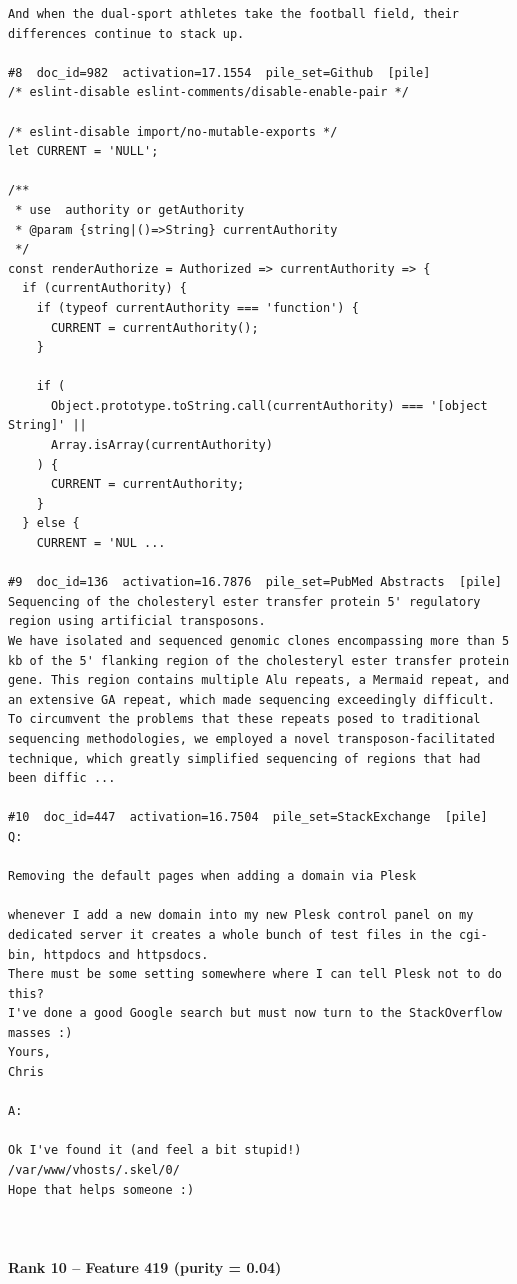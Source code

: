 \begin{verbatim}
And when the dual-sport athletes take the football field, their differences continue to stack up.

#8  doc_id=982  activation=17.1554  pile_set=Github  [pile]
/* eslint-disable eslint-comments/disable-enable-pair */

/* eslint-disable import/no-mutable-exports */
let CURRENT = 'NULL';

/**
 * use  authority or getAuthority
 * @param {string|()=>String} currentAuthority
 */
const renderAuthorize = Authorized => currentAuthority => {
  if (currentAuthority) {
    if (typeof currentAuthority === 'function') {
      CURRENT = currentAuthority();
    }

    if (
      Object.prototype.toString.call(currentAuthority) === '[object String]' ||
      Array.isArray(currentAuthority)
    ) {
      CURRENT = currentAuthority;
    }
  } else {
    CURRENT = 'NUL ...

#9  doc_id=136  activation=16.7876  pile_set=PubMed Abstracts  [pile]
Sequencing of the cholesteryl ester transfer protein 5' regulatory region using artificial transposons.
We have isolated and sequenced genomic clones encompassing more than 5 kb of the 5' flanking region of the cholesteryl ester transfer protein gene. This region contains multiple Alu repeats, a Mermaid repeat, and an extensive GA repeat, which made sequencing exceedingly difficult. To circumvent the problems that these repeats posed to traditional sequencing methodologies, we employed a novel transposon-facilitated technique, which greatly simplified sequencing of regions that had been diffic ...

#10  doc_id=447  activation=16.7504  pile_set=StackExchange  [pile]
Q:

Removing the default pages when adding a domain via Plesk

whenever I add a new domain into my new Plesk control panel on my dedicated server it creates a whole bunch of test files in the cgi-bin, httpdocs and httpsdocs.
There must be some setting somewhere where I can tell Plesk not to do this?
I've done a good Google search but must now turn to the StackOverflow masses :)
Yours,
Chris

A:

Ok I've found it (and feel a bit stupid!)
/var/www/vhosts/.skel/0/
Hope that helps someone :)



\end{verbatim}

\paragraph*{Rank 10 -- Feature 419 (purity = 0.04)}


